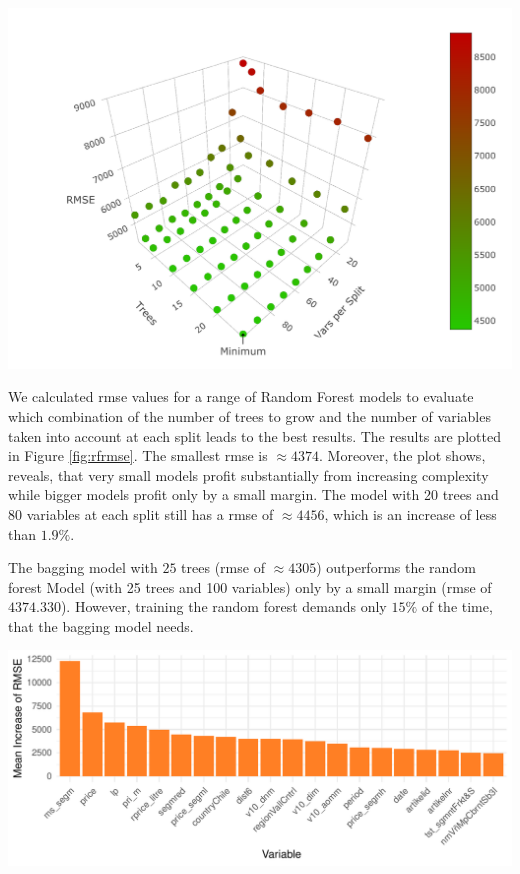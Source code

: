 \documentclass[11pt,]{article}
\let\origfigure\figure
\let\endorigfigure\endfigure
\renewenvironment{figure}[1][2] {
    \expandafter\origfigure\expandafter[H]
} {
    \endorigfigure
}
\begin{document}
\begin{figure}

{\centering \includegraphics{../00_data/output_paper/10_rf_plot} 

}

\caption[RMSE's of the Random Forest for Different Parameters]{\label{fig:rfrmse}Random Forest: Dependency between RMSE, the Number of Trees and the Number of Variables Included at each Split.}\label{fig:unnamed-chunk-10}
\end{figure}

We calculated \ac{rmse} values for a range of Random Forest models to
evaluate which combination of the number of trees to grow and the number
of variables taken into account at each split leads to the best results.
The results are plotted in Figure \ref{fig:rfrmse}. The smallest
\ac{rmse} is \(\approx 4374\). Moreover, the plot shows, reveals, that
very small models profit substantially from increasing complexity while
bigger models profit only by a small margin. The model with 20 trees and
80 variables at each split still has a \ac{rmse} of \(\approx 4456\),
which is an increase of less than \(1.9\%\).

The \ac{bagging} model with \(25\) trees (\ac{rmse} of \(\approx 4305\))
outperforms the random forest Model (with 25 trees and 100 variables)
only by a small margin (\ac{rmse} of \(4374.330\)). However, training
the random forest demands only \(15\%\) of the time, that the
\ac{bagging} model needs.

\begin{figure}
\centering
\includegraphics{../00_data/output_paper/11_var_imp_random_forest_bp.pdf}
\caption{\label{fig:rfimp}Random Forest: Variable Importance.}
\end{figure}
\end{document}
